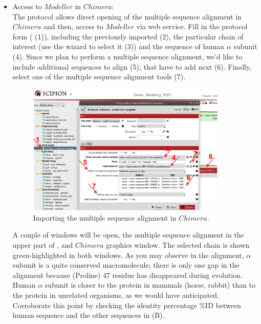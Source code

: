 \begin{itemize}
 \item Access to $Modeller$ in $Chimera$:\\
 The protocol  allows direct opening of the multiple sequence alignment in $Chimera$ and then, access to $Modeller$ via web service. Fill in the protocol form ( (1)), including the   previously imported (2), the particular chain of interest (use the wizard to select it (3)) and the  sequence of human  $\alpha$ subunit (4). Since we plan to perform a multiple sequence alignment, we'd like to include additional sequences to align (5), that have to add next (6). Finally, select one of the multiple sequence alignment tools (7). 
 
 \begin{figure}[H]
  \centering 
  \captionsetup{width=.7\linewidth} 
  \includegraphics[width=0.90\textwidth]{Images/Fig13}
  \caption{Importing the multiple sequence alignment in $Chimera$.}
  \label{fig:model_from_template_protocol}
  \end{figure}
 
 A couple of windows will be open, the multiple sequence alignment in the upper part of , and $Chimera$ graphics window. The  selected chain is shown green-highlighted in both windows. As you may observe in the alignment,  $\alpha$ subunit is a quite conserved macromolecule; there is only one gap in the alignment because  (Proline) 47 residue has disappeared during evolution. Human  $\alpha$ subunit is closer to the protein in mammals (horse, rabbit) than to the protein in unrelated organisms, as we would have anticipated. Corroborate this point by checking the identity percentage \%ID  between human sequence and the other sequences in  (B). 
 

\end{itemize}
